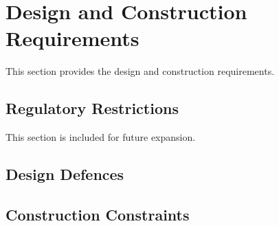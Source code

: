 \KNEADSECTIONNEWPAGE
\section{Design and Construction Requirements}
\label{lab:sec_DesignConstructionRequirements}


This section provides the \ThisSys design and construction requirements.

\KNEADSUBSECTIONNEWPAGE
\subsection{Regulatory Restrictions}
\label{lab:ssec_RegulatoryRestrictions}

This section is included for future expansion.




\KNEADSUBSECTIONNEWPAGE
\subsection{Design Defences}
\label{lab:ssec_DesignDefences}






\KNEADSUBSECTIONNEWPAGE
\subsection{Construction Constraints}
\label{lab:ssec_ConstructionConstraints}

